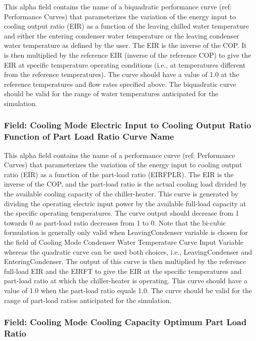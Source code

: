 This alpha field contains the name of a biquadratic performance curve (ref: Performance Curves) that parameterizes the variation of the energy input to cooling output ratio (EIR) as a function of the leaving chilled water temperature and either the entering condenser water temperature or the leaving condenser water temperature as defined by the user. The EIR is the inverse of the COP. It is then multiplied by the reference EIR (inverse of the reference COP) to give the EIR at specific temperature operating conditions (i.e., at temperatures different from the reference temperatures). The curve should have a value of 1.0 at the reference temperatures and flow rates specified above. The biquadratic curve should be valid for the range of water temperatures anticipated for the simulation.

\subsubsection{Field: Cooling Mode Electric Input to Cooling Output Ratio Function of Part Load Ratio Curve Name}\label{field-cooling-mode-electric-input-to-cooling-output-ratio-function-of-part-load-ratio-curve-name}

This alpha field contains the name of a performance curve (ref: Performance Curves) that parameterizes the variation of the energy input to cooling output ratio (EIR) as a function of the part-load ratio (EIRFPLR). The EIR is the inverse of the COP, and the part-load ratio is the actual cooling load divided by the available cooling capacity of the chiller-heater. This curve is generated by dividing the operating electric input power by the available full-load capacity at the specific operating temperatures. The curve output should decrease from 1 towards 0 as part-load ratio decreases from 1 to 0. Note that the bi-cubic formulation is generally only valid when LeavingCondenser variable is chosen for the field of Cooling Mode Condenser Water Temperature Curve Input Variable whereas the quadratic curve can be used both choices, i.e., LeavingCondenser and EnteringCondenser. The output of this curve is then multiplied by the reference full-load EIR and the EIRFT to give the EIR at the specific temperatures and part-load ratio at which the chiller-heater is operating. This curve should have a value of 1.0 when the part-load ratio equals 1.0. The curve should be valid for the range of part-load ratios anticipated for the simulation.

\subsubsection{Field: Cooling Mode Cooling Capacity Optimum Part Load Ratio}\label{field-cooling-mode-cooling-capacity-optimum-part-load-ratio}

